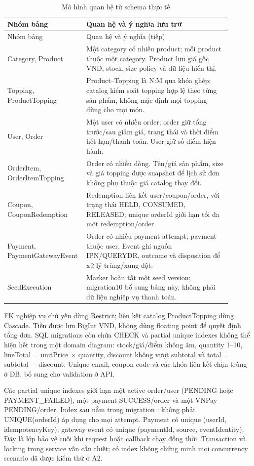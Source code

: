 \begin{longtable}{>{\raggedright\arraybackslash}p{0.27\linewidth}>{\raggedright\arraybackslash}p{0.63\linewidth}}
\caption[Mô hình quan hệ từ schema thực tế]{Mô hình quan hệ từ schema thực tế}\label{tab:relational-model}\\
\toprule Nhóm bảng & Quan hệ và ý nghĩa lưu trữ \\ \midrule
\endfirsthead
\toprule Nhóm bảng & Quan hệ và ý nghĩa (tiếp) \\ \midrule \endhead
Category, Product & Một category có nhiều product; mỗi product thuộc một category.
Product lưu giá gốc VND, stock, size policy và dữ liệu hiển thị. \\
Topping, ProductTopping & Product--Topping là N:M qua khóa ghép; catalog kiểm soát
topping hợp lệ theo từng sản phẩm, không mặc định mọi topping dùng cho mọi món. \\
User, Order & Một user có nhiều order; order giữ tổng trước/sau giảm giá,
trạng thái và thời điểm hết hạn/thanh toán. User giữ số điểm hiện hành. \\
OrderItem, OrderItemTopping & Order có nhiều dòng. Tên/giá sản phẩm, size và giá
topping được snapshot để lịch sử đơn không phụ thuộc giá catalog thay đổi. \\
Coupon, CouponRedemption & Redemption liên kết user/coupon/order, với trạng thái
HELD, CONSUMED, RELEASED; unique orderId giới hạn tối đa một redemption/order. \\
Payment, PaymentGatewayEvent & Order có nhiều payment attempt; payment thuộc user.
Event ghi nguồn IPN/QUERYDR, outcome và disposition để xử lý trùng/xung đột. \\
SeedExecution & Marker hoàn tất một seed version; migration10 bổ sung bảng này,
không phải dữ liệu nghiệp vụ thanh toán. \\
\bottomrule
\end{longtable}

FK nghiệp vụ chủ yếu dùng Restrict; liên kết catalog ProductTopping dùng Cascade.
Tiền được lưu BigInt VND, không dùng floating point để quyết định tổng đơn.
SQL migrations còn chứa CHECK và partial unique indexes không thể hiện hết
trong một domain diagram: stock/giá/điểm không âm, quantity 1--10,
lineTotal = unitPrice $\times$ quantity, discount không vượt subtotal và
total = subtotal $-$ discount. Unique email, coupon code và các khóa liên kết
chặn trùng ở DB, bổ sung cho validation ở API.

Các partial unique indexes giới hạn một active order/user
(PENDING hoặc PAYMENT\_FAILED), một payment SUCCESS/order và một VNPay
PENDING/order. Index sau nằm trong migration
; không phải
UNIQUE(orderId) áp dụng cho mọi attempt. Payment có unique
(userId, idempotencyKey); gateway event có unique (paymentId, source,
eventIdentity). Đây là lớp bảo vệ cuối khi request hoặc callback chạy đồng
thời. Transaction và locking trong service vẫn cần thiết; có index không
chứng minh mọi concurrency scenario đã được kiểm thử ở A2.

